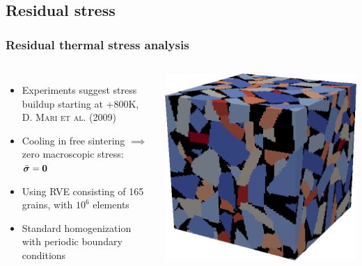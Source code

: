 \documentclass[11pt]{beamer} %
\begin{document}
\subsection{Residual stress}
\begin{frame}
 \frametitle{Residual thermal stress analysis}
 \begin{columns}
 \begin{itemize}
  \item Experiments suggest stress buildup starting at +800\si{\kelvin},\\ \textsc{D. Mari et al. (2009)}
  \item Cooling in free sintering $\implies$ zero macroscopic stress: $\bar{\boldsymbol{\sigma}} = \boldsymbol{0}$

  \item Using RVE consisting of 165 grains, with $10^6$ elements
  \item Standard homogenization with periodic boundary conditions
 \end{itemize}
 \includegraphics[width=1\linewidth]{figures/RVE}
 \end{columns}
\end{frame}
\end{document}
